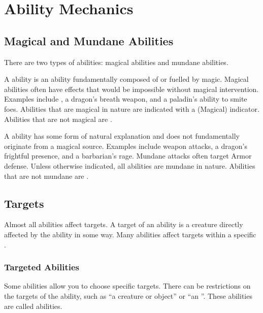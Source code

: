 \section{Ability Mechanics}\label{Ability Mechanics}

    \subsection{Magical and Mundane Abilities}\label{Magical and Mundane Abilities}

        There are two types of abilities: magical abilities and mundane abilities.

        \label{Magical Abilities} A  ability is an ability fundamentally composed of or fuelled by magic.
        Magical abilities often have effects that would be impossible without magical intervention.
        Examples include , a dragon's breath weapon, and a paladin's ability to smite foes.
        Abilities that are magical in nature are indicated with a (Magical) indicator.
        Abilities that are not magical are .

        \label{Mundane Abilities} A  ability has some form of natural explanation and does not fundamentally originate from a magical source.
        Examples include weapon attacks, a dragon's frightful presence, and a barbarian's rage.
        Mundane attacks often target Armor defense.
        Unless otherwise indicated, all abilities are mundane in nature.
        Abilities that are not mundane are .

    \subsection{Targets}\label{Targets}
        Almost all abilities affect targets.
        A target of an ability is a creature directly affected by the ability in some way.
        Many abilities affect targets within a specific .

        \subsubsection{Targeted Abilities}\label{Targeted Abilities}
            Some abilities allow you to choose specific targets.
            There can be restrictions on the targets of the ability, such as ``a creature or object'' or ``an ''.
            These abilities are called  abilities.

